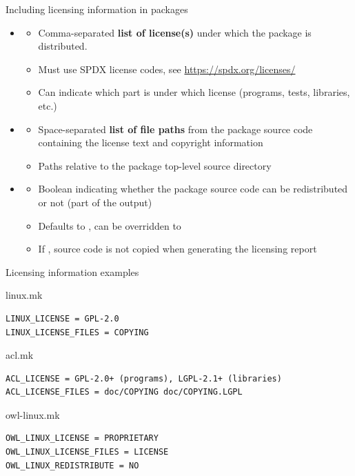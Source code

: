 \begin{frame}{Including licensing information in packages}
  \begin{itemize}
  \item {}
    \begin{itemize}
    \item Comma-separated {\bf list of license(s)} under which the
      package is distributed.
    \item Must use SPDX license codes, see
      \url{https://spdx.org/licenses/}
    \item Can indicate which part is under which license (programs,
      tests, libraries, etc.)
    \end{itemize}
  \item {}
    \begin{itemize}
    \item Space-separated {\bf list of file paths} from the package
      source code containing the license text and copyright
      information
    \item Paths relative to the package top-level source directory
    \end{itemize}
  \item {}
    \begin{itemize}
    \item Boolean indicating whether the package source code can be
      redistributed or not (part of the  output)
    \item Defaults to , can be overridden to 
    \item If , source code is not copied when generating the
      licensing report
    \end{itemize}
  \end{itemize}
\end{frame}

\begin{frame}[fragile]{Licensing information examples}
  \begin{block}{linux.mk}
\begin{verbatim}
LINUX_LICENSE = GPL-2.0
LINUX_LICENSE_FILES = COPYING
\end{verbatim}
  \end{block}

\begin{block}{acl.mk}
\begin{verbatim}
ACL_LICENSE = GPL-2.0+ (programs), LGPL-2.1+ (libraries)
ACL_LICENSE_FILES = doc/COPYING doc/COPYING.LGPL
\end{verbatim}
\end{block}

\begin{block}{owl-linux.mk}
\begin{verbatim}
OWL_LINUX_LICENSE = PROPRIETARY
OWL_LINUX_LICENSE_FILES = LICENSE
OWL_LINUX_REDISTRIBUTE = NO
\end{verbatim}
\end{block}

\end{frame}


